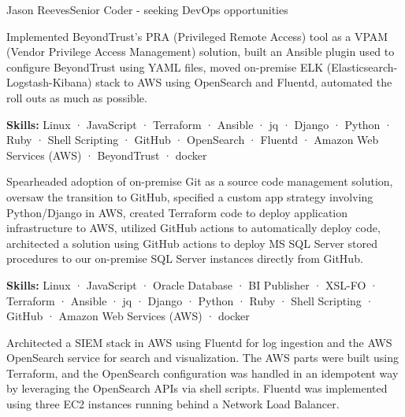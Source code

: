 \documentclass{article}
\begin{document}
\begin{cv}[avatar]{Jason Reeves}{Senior Coder - seeking DevOps opportunities}
\begin{cvevent}[August 2021][present]
    Implemented BeyondTrust's PRA (Privileged Remote Access) tool as a VPAM (Vendor Privilege Access Management) solution, built an Ansible plugin used to configure BeyondTrust using YAML files, moved on-premise ELK (Elasticsearch-Logstash-Kibana) stack to AWS using OpenSearch and Fluentd, automated the roll outs as much as possible.

    \vspace*{3mm}
    \textbf{Skills:}  Linux · JavaScript · Terraform · Ansible · jq · Django · Python · Ruby · Shell Scripting · GitHub · OpenSearch · Fluentd · Amazon Web Services (AWS) · BeyondTrust · docker

    \vspace*{5mm}
\end{cvevent}

\begin{cvevent}[Mar 2018][Aug 2021]
  Spearheaded adoption of on-premise Git as a source code management solution, oversaw the transition to GitHub, specified a custom app strategy involving Python/Django in AWS, created Terraform code to deploy application infrastructure to AWS, utilized GitHub actions to automatically deploy code, architected a solution using GitHub actions to deploy MS SQL Server stored procedures to our on-premise SQL Server instances directly from GitHub.
  
  \vspace*{3mm}
  \textbf{Skills:}  Linux · JavaScript · Oracle Database · BI Publisher · XSL-FO · Terraform · Ansible · jq · Django · Python · Ruby · Shell Scripting · GitHub · Amazon Web Services (AWS) · docker
\end{cvevent}


\onecolumn
{}  %

\begin{cvevent}[2022-2023]
    Architected a SIEM stack in AWS using Fluentd for log ingestion and the AWS OpenSearch service for search and visualization.  The AWS parts were built using Terraform, and the OpenSearch configuration was handled in an idempotent way by leveraging the OpenSearch APIs via shell scripts.  Fluentd was implemented using three EC2 instances running behind a Network Load Balancer.  
    \vspace*{5mm}
\end{cvevent}


\end{cv}
\end{document}
